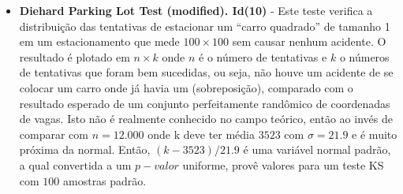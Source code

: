 \begin{itemize}
   \item \textbf{Diehard Parking Lot Test (modified). Id(10)} - Este teste verifica a distribuição das tentativas de estacionar um ``carro quadrado'' de tamanho 1 em um estacionamento que mede $100\times100$ sem causar nenhum acidente. O resultado é plotado em $n \times k$ onde $n$ é o número de tentativas e $k$ o números de tentativas que foram bem sucedidas, ou seja, não houve um acidente de se colocar um carro onde já havia um (sobreposição), comparado com o resultado esperado de um conjunto perfeitamente randômico de coordenadas de vagas. Isto não é realmente conhecido no campo teórico, então ao invés de comparar com $n=12.000$ onde k deve ter média $3523$ com $\sigma=21.9$ e é muito próxima da normal. Então, $(k-3523)/21.9$ é uma variável normal padrão, a qual convertida a um $p-valor$ uniforme, provê valores para um teste KS com $100$ amostras padrão.
   

\end{itemize}

